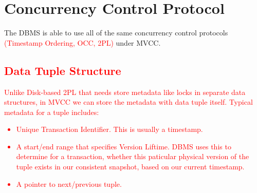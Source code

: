 \documentclass[11pt]{article}
\newcommand{\rr}[1]{\textcolor{red}{#1}}
\begin{document}
\section{Concurrency Control Protocol}
The DBMS is able to use all of the same concurrency control protocols \rr{(Timestamp Ordering, OCC, 2PL)} under MVCC.
\rr{\subsection*{Data Tuple Structure}}

\rr{Unlike Disk-based 2PL that needs store metadata like locks in separate data structures, in MVCC we can store the metadata with data tuple itself. Typical metadata for a tuple includes:
\begin{itemize}
    \item Unique Transaction Identifier. This is usually a timestamp.
    \item A start/end range that specifies Version Liftime. DBMS uses this to determine for a transaction, whether this paticular physical version of the tuple exists in our consistent snapshot, based on our current timestamp.
    \item A pointer to next/previous tuple.
\end{itemize}}
\end{document}
